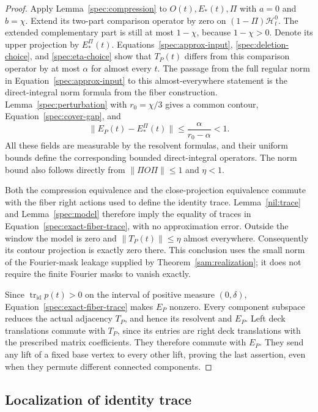 \begin{proof}
Apply Lemma~\ref{spec:compression} to $O(t),E_*(t),\Pi$ with $a=0$ and
$b=\chi$.  Extend its two-part comparison operator by zero on
$(1-\Pi)\mathcal H_t^0$.  The extended complementary part is still at
most $1-\chi$, because $1-\chi>0$.  Denote its upper projection by
$E_*^\Pi(t)$.  Equations~\eqref{spec:approx-input},
\eqref{spec:deletion-choice}, and \eqref{spec:eta-choice} show that $T_P(t)$
differs from this comparison operator by at most $\alpha$ for almost
every $t$.  The passage from the full regular norm in
Equation~\eqref{spec:approx-input} to this almost-everywhere statement is
the direct-integral norm formula from the fiber construction.  Lemma~\ref{spec:perturbation}
with $r_0=\chi/3$ gives a common contour, Equation~\eqref{spec:cover-gap},
and
\[
       \|E_P(t)-E_*^\Pi(t)\|
              \leq\frac{\alpha}{r_0-\alpha}<1.
\]
All these fields are measurable by the resolvent formulas, and their
uniform bounds define the corresponding bounded direct-integral
operators.  The norm bound also follows directly from
$\|\Pi O\Pi\|\leq1$ and $\eta<1$.

Both the compression equivalence and the close-projection equivalence
commute with the fiber right actions used to define the identity trace.
Lemma~\ref{nil:trace} and Lemma~\ref{spec:model} therefore imply the
equality of traces in Equation~\eqref{spec:exact-fiber-trace}, with no
approximation error.  Outside the window the model is zero and
$\|T_P(t)\|\leq\eta$ almost everywhere.  Consequently its contour
projection is exactly zero there.  This conclusion uses the small norm
of the Fourier-mask leakage supplied by Theorem~\ref{sam:realization}; it
does not require the finite Fourier masks to vanish exactly.

Since $\operatorname{tr}_{\mathrm{id}}p(t)>0$ on the interval of positive
measure $(0,\delta)$, Equation~\eqref{spec:exact-fiber-trace} makes $E_P$
nonzero.  Every component subspace reduces the actual adjacency $T_P$,
and hence its resolvent and $E_P$.  Left deck translations commute with
$T_P$, since its entries are right deck translations with the prescribed
matrix coefficients.  They therefore commute with $E_P$.  They send any
lift of a fixed base vertex to every other lift, proving the last
assertion, even when they permute different connected components.
\end{proof}

\subsection{Localization of identity trace}

